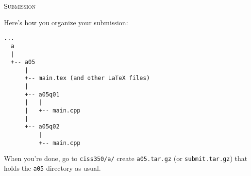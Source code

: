 \textsc{Submission}

Here's how you organize your submission:

\begin{Verbatim}[fontsize=\footnotesize]
...
  a
  |
  +-- a05
      |
      +-- main.tex (and other LaTeX files)
      |
      +-- a05q01
      |   |
      |   +-- main.cpp
      |
      +-- a05q02
          |
          +-- main.cpp
\end{Verbatim}
When you're done, go to \verb!ciss350/a/!
create \verb!a05.tar.gz! (or \verb!submit.tar.gz!) that holds
the \verb!a05! directory as usual.

